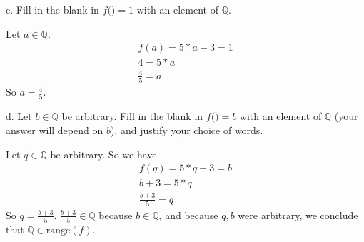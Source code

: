 \documentclass[12pt]{article}
\newenvironment{problem}[2][Problem]
{
	\begin{trivlist} 
		\item[\hskip \labelsep {\bfseries #1 #2:}]
	}
{
	\end{trivlist}
	}
\newenvironment{solution}[1][Solution]
{
	\begin{trivlist} 
		\item[\hskip \labelsep {\itshape #1:}]
	}
	{
	\end{trivlist}
}
\begin{document}
{\begin{problem}{6}
\begin{solution}
	\end{solution}
	\noindent
	c. Fill in the blank in $f($\textunderscore \textunderscore \textunderscore \textunderscore $) =1$ with an element of $\mathbb{Q}$.
	\begin{solution}
	Let $a \in \mathbb{Q}$.
	\begin{align*}
	f(a)=5*a -3 = 1\\
	4= 5*a\\
	\frac{4}{5}=a
	\end{align*}
	So $a=\frac{4}{5}$.
	\end{solution}
	\noindent
	d. Let $b \in \mathbb{Q}$ be arbitrary. Fill in the blank in $f($\textunderscore \textunderscore \textunderscore \textunderscore $) =b$ with an element of $\mathbb{Q}$ (your answer will depend on $b$), and justify your choice of words.
	\begin{solution}
	Let $q \in \mathbb{Q}$ be arbitrary. So we have
	\begin{align*}
	f(q)=5*q -3 = b\\
	b+3= 5*q\\
	\frac{b+3}{5}=q
	\end{align*}
	So $q=\frac{b+3}{5}$.
	\newline
	\newline
	\noindent $\frac{b+3}{5} \in \mathbb{Q}$ because $b \in \mathbb{Q}$, and because $q,b$ were arbitrary, we conclude that $\mathbb{Q} \in \text{range}(f)$.
	\end{solution}

\end{problem}
\end{document}
